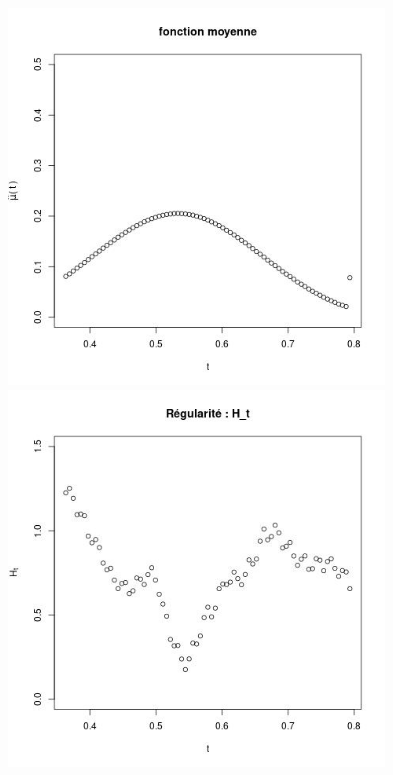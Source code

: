 \begin{figure}[H]
\begin{minipage}{0.48\textwidth}
	\includegraphics[width=0.89\textwidth]{Images/pv_estim/hiv_187128_mut.jpg}
	\end{minipage}
	\begin{minipage}{0.48\textwidth}
		\includegraphics[width=0.89\textwidth]{Images/pv_estim/ete_187128_Ht.jpg}

\end{minipage}
\end{figure}
